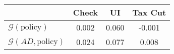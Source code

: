 \begin{tabular}{@{}lccc@{}} 
\toprule 
                          & Check      & UI    & Tax Cut    \\  \midrule 
$\mathcal{G}(\text{policy})$ & 0.002  & 0.060  & -0.001     \\ 
$\mathcal{G}(AD,\text{policy})$ & 0.024  & 0.077  & 0.008     \\ 
\end{tabular}  
